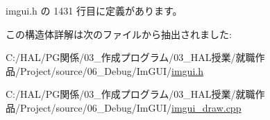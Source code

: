  imgui.\+h の 1431 行目に定義があります。



この構造体詳解は次のファイルから抽出されました\+:\begin{DoxyCompactItemize}
\item 
C\+:/\+H\+A\+L/\+P\+G関係/03\+\_\+作成プログラム/03\+\_\+\+H\+A\+L授業/就職作品/\+Project/source/06\+\_\+\+Debug/\+Im\+G\+U\+I/\mbox{\hyperlink{imgui_8h}{imgui.\+h}}\item 
C\+:/\+H\+A\+L/\+P\+G関係/03\+\_\+作成プログラム/03\+\_\+\+H\+A\+L授業/就職作品/\+Project/source/06\+\_\+\+Debug/\+Im\+G\+U\+I/\mbox{\hyperlink{imgui__draw_8cpp}{imgui\+\_\+draw.\+cpp}}\end{DoxyCompactItemize}
